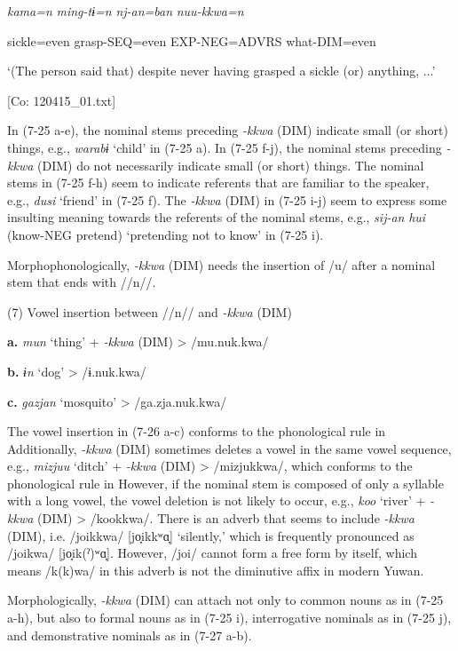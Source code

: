       \textit{kama=n}  \textit{ming-tɨ=n}  \textit{nj-an=ban}  \textit{nuu-kkwa=n}

      sickle=even  grasp-SEQ=even  EXP-NEG=ADVRS  what-DIM=even

      ‘(The person said that) despite never having grasped a sickle (or) anything, ...’

      [Co: 120415\_01.txt]

In (7-25 a-e), the nominal stems preceding \textit{{}-kkwa} (DIM) indicate small (or short) things, e.g., \textit{warabɨ} ‘child’ in (7-25 a). In (7-25 f-j), the nominal stems preceding \textit{{}-kkwa} (DIM) do not necessarily indicate small (or short) things. The nominal stems in (7-25 f-h) seem to indicate referents that are familiar to the speaker, e.g., \textit{dusi} ‘friend’ in (7-25 f). The \textit{{}-kkwa} (DIM) in (7-25 i-j) seem to express some insulting meaning towards the referents of the nominal stems, e.g., \textit{sij-an} \textit{hui} (know-NEG pretend) ‘pretending not to know’ in (7-25 i).

  Morphophonologically, \textit{{}-kkwa} (DIM) needs the insertion of /u/ after a nominal stem that ends with //n//.

(7)  Vowel insertion between //n// and \textit{{}-kkwa} (DIM)

  \textbf{a.}  \textit{mun}  ‘thing’  +  \textit{{}-kkwa} (DIM)  >  /mu.nuk.kwa/

  \textbf{b.}  \textit{ɨn}  ‘dog’      >  /ɨ.nuk.kwa/

  \textbf{c.}  \textit{gazjan}  ‘mosquito’      >  /ga.zja.nuk.kwa/

The vowel insertion in (7-26 a-c) conforms to the phonological rule in  Additionally, \textit{{}-kkwa} (DIM) sometimes deletes a vowel in the same vowel sequence, e.g., \textit{mizjuu} ‘ditch’ + \textit{{}-kkwa} (DIM) > /mizjukkwa/, which conforms to the phonological rule in  However, if the nominal stem is composed of only a syllable with a long vowel, the vowel deletion is not likely to occur, e.g., \textit{koo} ‘river’ + \textit{{}-kkwa} (DIM) > /kookkwa/. There is an adverb that seems to include \textit{{}-kkwa} (DIM), i.e. /joikkwa/ [jo̞ikkʷɑ̞] ‘silently,’ which is frequently pronounced as /joikwa/ [jo̞ik(ˀ)ʷɑ̞]. However, /joi/ cannot form a free form by itself, which means /k(k)wa/ in this adverb is not the diminutive affix in modern Yuwan.

  Morphologically, \textit{{}-kkwa} (DIM) can attach not only to common nouns as in (7-25 a-h), but also to formal nouns as in (7-25 i), interrogative nominals as in (7-25 j), and demonstrative nominals as in (7-27 a-b).

